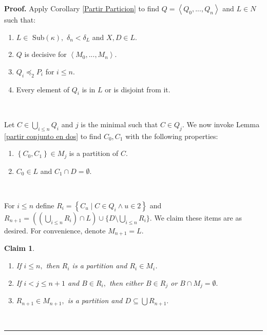 \documentclass{article}%
\newtheorem{claim}[theorem]{Claim}
\newenvironment{proof}[1][Proof]{\noindent\textbf{#1.} }{\ \rule{0.5em}{0.5em}}
\begin{document}
\begin{proof}
Apply Corollary \ref{Partir Particion} to find $Q=\left\langle Q_{0}%
,...,Q_{n}\right\rangle $ and $L\in N$ such that:

\begin{enumerate}
\item $L\in$ \textsf{Sub}$\left(  \kappa\right)  ,$ $\delta_{n}<\delta_{L}$
and $X,D\in L.$

\item $Q$ is decisive for $\left\langle M_{0},...,M_{n}\right\rangle .$

\item $Q_{i}\preceq_{2}P_{i}$ for $i\leq n.$

\item Every element of $Q_{i}$ is in $L$ or is disjoint from it.
\end{enumerate}

\qquad\ \ \ 

Let $C\in\bigcup\limits_{i\leq n}Q_{i}$ and $j$ is the minimal such that $C\in
Q_{j}.$ We now invoke Lemma \ref{partir conjunto en dos} to find $C_{0},C_{1}$
with the following properties:

\begin{enumerate}
\item $\left\{  C_{0},C_{1}\right\}  \in M_{j}$ is a partition of $C.$

\item $C_{0}\in L$ and $C_{1}\cap D=\emptyset.$
\end{enumerate}

\qquad\ \qquad\ \ 

For $i\leq n$ define $R_{i}=\left\{  C_{u}\mid C\in Q_{i}\wedge u\in2\right\}
$ and\newline$R_{n+1}=\left(  (\bigcup\limits_{i\leq n}R_{i})\cap L\right)
\cup\{D\setminus\bigcup\limits_{i\leq n}R_{i}\}.$ We claim these items are as
desired. For convenience, denote $M_{n+1}=L.$

\begin{claim}
\qquad\ \ \ \ \ \ \ \ \qquad\ \ \ \ \ \ \ \ \qquad\ \ \ \ \ \ \ 

\begin{enumerate}
\item If $i\leq n,$ then $R_{i}$ is a partition and $R_{i}\in M_{i}$.

\item If $i<j\leq n+1$ and $B\in R_{i},$ then either $B\in R_{j}$ or $B\cap
M_{j}=\emptyset.$

\item $R_{n+1}\in M_{n+1},$ is a partition and $D\subseteq\bigcup R_{n+1}.$
\end{enumerate}
\end{claim}


\end{proof}
\end{document}
